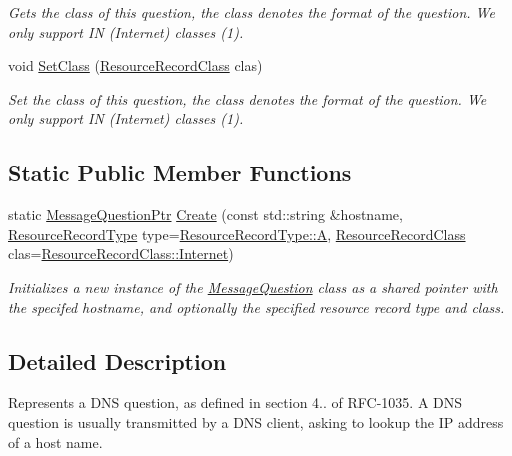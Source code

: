 \begin{DoxyCompactItemize}
\begin{DoxyCompactList}\small\item\em Gets the class of this question, the class denotes the format of the question. We only support I\-N (Internet) classes (1). \end{DoxyCompactList}\item 
void \hyperlink{class_senergy_1_1_dns_1_1_message_question_a8676f25315240afe4473154f3708d3e5}{Set\-Class} (\hyperlink{namespace_senergy_1_1_dns_a953f153bc411213d621d00c1e1b3eb9d}{Resource\-Record\-Class} clas)
\begin{DoxyCompactList}\small\item\em Set the class of this question, the class denotes the format of the question. We only support I\-N (Internet) classes (1). \end{DoxyCompactList}\end{DoxyCompactItemize}
\subsection*{Static Public Member Functions}
\begin{DoxyCompactItemize}
\item 
static \hyperlink{message__question_8h_a4b780ef30c07c3c31b79d838bc443687}{Message\-Question\-Ptr} \hyperlink{class_senergy_1_1_dns_1_1_message_question_ae8237696d15da3b4b67f96fbd3d1d3e3}{Create} (const std\-::string \&hostname, \hyperlink{namespace_senergy_1_1_dns_a590bfd748c955364770f5ce358d9dfe0}{Resource\-Record\-Type} type=\hyperlink{namespace_senergy_1_1_dns_a590bfd748c955364770f5ce358d9dfe0a7fc56270e7a70fa81a5935b72eacbe29}{Resource\-Record\-Type\-::\-A}, \hyperlink{namespace_senergy_1_1_dns_a953f153bc411213d621d00c1e1b3eb9d}{Resource\-Record\-Class} clas=\hyperlink{namespace_senergy_1_1_dns_a953f153bc411213d621d00c1e1b3eb9dac8205c7636e728d448c2774e6a4a944b}{Resource\-Record\-Class\-::\-Internet})
\begin{DoxyCompactList}\small\item\em Initializes a new instance of the \hyperlink{class_senergy_1_1_dns_1_1_message_question}{Message\-Question} class as a shared pointer with the specifed hostname, and optionally the specified resource record type and class. \end{DoxyCompactList}\end{DoxyCompactItemize}


\subsection{Detailed Description}
Represents a D\-N\-S question, as defined in section 4.. of R\-F\-C-\/1035. A D\-N\-S question is usually transmitted by a D\-N\-S client, asking to lookup the I\-P address of a host name. 

